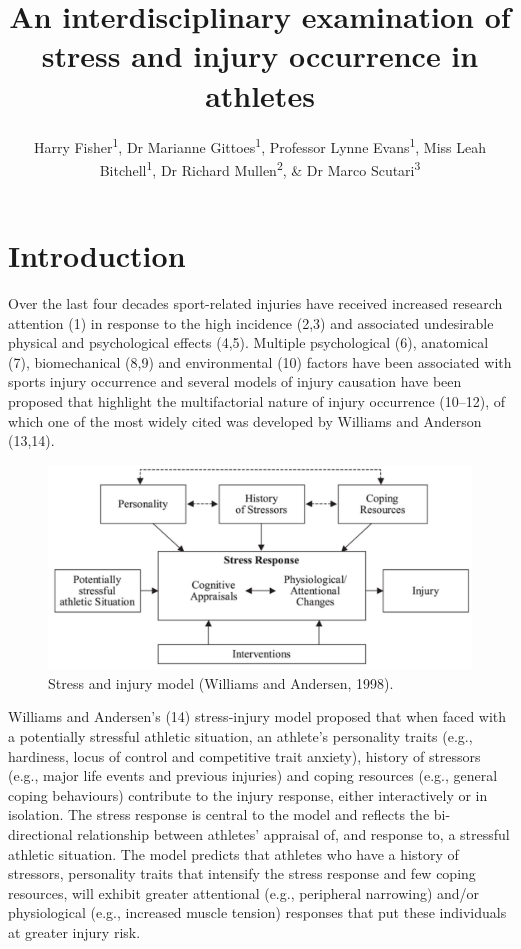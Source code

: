 \documentclass[
  english,
  man]{apa6}
\author{Harry Fisher\textsuperscript{1}, Dr Marianne Gittoes\textsuperscript{1}, Professor Lynne Evans\textsuperscript{1}, Miss Leah Bitchell\textsuperscript{1}, Dr Richard Mullen\textsuperscript{2}, \& Dr Marco Scutari\textsuperscript{3}}
\affiliation{
\vspace{0.5cm}
\textsuperscript{1} Cardiff Metropolitan University, Cardiff, United Kingdom\\\textsuperscript{2} Brunel University, London, United Kingdom\\\textsuperscript{3} Istituto Dalle Molle di Studi sull'Intelligenza Artificiale (IDSIA), Manno, Switzerland}
\title{An interdisciplinary examination of stress and injury occurrence in athletes}
\date{}
\begin{document}
\maketitle

\hypertarget{introduction}{%
\section{Introduction}\label{introduction}}

Over the last four decades sport-related injuries have received increased research attention (1) in response to the high incidence (2,3) and associated undesirable physical and psychological effects (4,5). Multiple psychological (6), anatomical (7), biomechanical (8,9) and environmental (10) factors have been associated with sports injury occurrence and several models of injury causation have been proposed that highlight the multifactorial nature of injury occurrence (10--12), of which one of the most widely cited was developed by Williams and Anderson (13,14).

\begin{figure}[!h]

{\centering \includegraphics[width=5.67in]{figures_doc/Fig1} 

}

\caption{Stress and injury model (Williams and Andersen, 1998).}\label{fig:fig1}
\end{figure}

Williams and Andersen's (14) stress-injury model proposed that when faced with a potentially stressful athletic situation, an athlete's personality traits (e.g., hardiness, locus of control and competitive trait anxiety), history of stressors (e.g., major life events and previous injuries) and coping resources (e.g., general coping behaviours) contribute to the injury response, either interactively or in isolation. The stress response is central to the model and reflects the bi-directional relationship between athletes' appraisal of, and response to, a stressful athletic situation. The model predicts that athletes who have a history of stressors, personality traits that intensify the stress response and few coping resources, will exhibit greater attentional (e.g., peripheral narrowing) and/or physiological (e.g., increased muscle tension) responses that put these individuals at greater injury risk.
\end{document}
